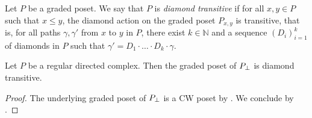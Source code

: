 \begin{dfn} 
    Let \( P \) be a graded poset.
    We say that \( P \) is \emph{diamond transitive} if for all \( x, y \in P \) such that \( x \le y \), the diamond action on the graded poset \( P_{x, y} \) is transitive, that is, for all paths \( \gamma, \gamma' \) from \( x \) to \( y \) in \( P \), there exist \( k \in \mathbb{N} \) and a sequence \( (D_i)_{i = 1}^k \) of diamonds in \( P \) such that \( \gamma' = D_1 \cdot \ldots \cdot D_k \cdot \gamma \).
\end{dfn}

\begin{lem} \label{lem:diamond_transitive}
    Let \( P \) be a regular directed complex.
    Then the graded poset of \( {{P}_\bot} \) is diamond transitive.
\end{lem}
\begin{proof}
    The underlying graded poset of \( {{P}_\bot} \) is a CW poset by \cite[Corollary 10.3.3]{hadzihasanovic2024combinatorics}.
    We conclude by \cite[Theorem 5.14]{chandler2019thin}.
\end{proof}

